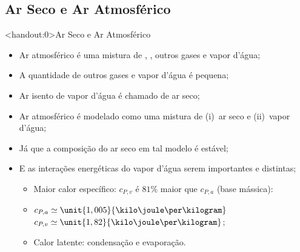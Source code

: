 \subsection{Ar Seco e Ar Atmosférico}

    \newcommand{\THISFRAMECONTENTS}{
        \begin{itemize}
            \item<1-> \alert{Ar atmosférico} é uma mistura de \textcolor{black}{\ce{N2},
                \ce{O2},} outros gases e \alert{vapor d'água};
            \item<2-> A quantidade de outros gases e vapor d'água é pequena;
            \item<3-> Ar \alert{isento} de vapor d'água é chamado de \alert{ar seco};
            \item<4-> Ar atmosférico é modelado como uma mistura de (i)~\alert{ar seco} e
                (ii)~\alert{vapor d'água};
            \item<5-> Já que a composição do ar seco em tal modelo é estável;
            \item<6-> E as interações \alert{energéticas} do \alert{vapor d'água} serem
                \alert{importantes} e \alert{distintas}; \\[\smallskipamount]
            \begin{itemize}
                \item<7-> Maior \alert{calor específico}: $c_{P,v}$ é \alert{$81\%$ maior} que
                    $c_{P,a}$ (base mássica): \\[\smallskipamount]
                \item<8-> $c_{P,a} \simeq \unit{1,005}{\kilo\joule\per\kilogram}$
                    $c_{P,v} \simeq \unit{1,82}{\kilo\joule\per\kilogram}$; \\[\smallskipamount]
                \item<9-> \alert{Calor latente}: condensação e evaporação.
            \end{itemize}
        \end{itemize}
    }
    {
    \begin{frame}<handout:0>{Ar Seco e Ar Atmosférico}\vspace*{-0em}
        \THISFRAMECONTENTS
    \end{frame}}
